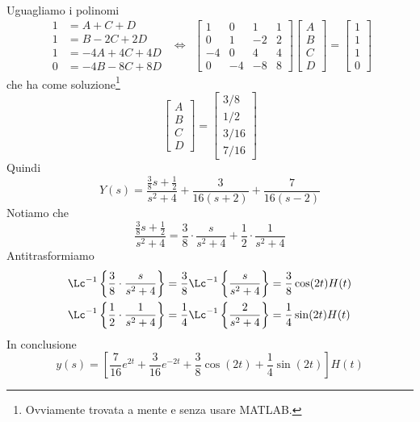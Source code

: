 Uguagliamo i polinomi
\begin{equation*}
\begin{aligned}
1 & = A + C + D\\
1 & = B - 2C + 2D\\
1 & = - 4A + 4C + 4D\\
0 & = - 4B - 8C + 8D
\end{aligned} \ \ \iff \ \
\begin{bmatrix}
1 & 0 & 1 & 1\\
0 & 1 & - 2 & 2\\
- 4 & 0 & 4 & 4\\
0 & - 4 & - 8 & 8
\end{bmatrix}
\begin{bmatrix}
A\\
B\\
C\\
D
\end{bmatrix} =
\begin{bmatrix}
1\\
1\\
1\\
0
\end{bmatrix}
\end{equation*}
che ha come soluzione\footnote{Ovviamente trovata a mente e senza usare MATLAB.}
\begin{equation*}
\begin{bmatrix}
A\\
B\\
C\\
D
\end{bmatrix} =
\begin{bmatrix}
3/8\\
1/2\\
3/16\\
7/16
\end{bmatrix}
\end{equation*}
Quindi
\begin{equation*}
Y(s) = \frac{\frac{3}{8} s + \frac{1}{2}}{s^{2} + 4} + \frac{3}{16(s + 2)} + \frac{7}{16(s - 2)}
\end{equation*}
Notiamo che
\begin{equation*}
\frac{\frac{3}{8} s + \frac{1}{2}}{s^{2} + 4} = \frac{3}{8} \cdot \frac{s}{s^{2} + 4} + \frac{1}{2} \cdot \frac{1}{s^{2} + 4}
\end{equation*}
Antitrasformiamo
\begin{align*}
\Lc^{- 1}\left\{\frac{3}{8} \cdot \frac{s}{s^{2} + 4}\right\} & = \frac{3}{8}\Lc^{- 1}\left\{\frac{s}{s^{2} + 4}\right\} = \frac{3}{8}\cos(2t) H(t)\\
\Lc^{- 1}\left\{\frac{1}{2} \cdot \frac{1}{s^{2} + 4}\right\} & = \frac{1}{4}\Lc^{- 1}\left\{\frac{2}{s^{2} + 4}\right\} = \frac{1}{4}\sin(2t) H(t)
\end{align*}
In conclusione
\begin{equation*}
y(s) = \left[\frac{7}{16} e^{2t} + \frac{3}{16} e^{- 2t} + \frac{3}{8}\cos(2t) + \frac{1}{4}\sin(2t)\right] H(t)
\end{equation*}

